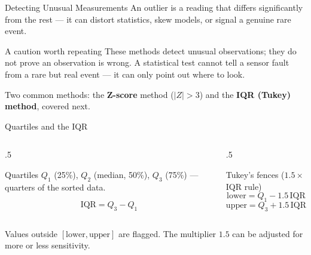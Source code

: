 \documentclass[9pt,aspectratio=169,xcolor=table]{beamer}
\begin{document}
\begin{frame}{Detecting Unusual Measurements}
    \leavevmode
    \small
    An outlier is a reading that differs significantly from the rest ---
    it can distort statistics, skew models, or signal a genuine rare
    event.

    \vspace{2mm}
    \begin{alertblock}{A caution worth repeating}
        These methods detect \alert{unusual} observations; they do not
        prove an observation is \alert{wrong}. A statistical test cannot
        tell a sensor fault from a rare but real event --- it can only
        point out where to look.
    \end{alertblock}

    \vspace{2mm}
    Two common methods: the \textbf{Z-score} method ($|Z| > 3$) and the
    \textbf{IQR (Tukey) method}, covered next.
\end{frame}

\begin{frame}{Quartiles and the IQR}
    \leavevmode
    \begin{columns}[t]
        \begin{column}{.5\textwidth}
            \begin{block}{Quartiles}
                \small $Q_1$ (25\%), $Q_2$ (median, 50\%), $Q_3$ (75\%)
                --- quarters of the sorted data.
            \end{block}
            \vspace{2mm}
            \[
            \text{IQR} = Q_3 - Q_1
            \]
        \end{column}
        \begin{column}{.5\textwidth}
            \begin{block}{Tukey's fences ($1.5\times$IQR rule)}
                \small
                \[
                \text{lower} = Q_1 - 1.5\,\text{IQR}
                \]
                \[
                \text{upper} = Q_3 + 1.5\,\text{IQR}
                \]
            \end{block}
        \end{column}
    \end{columns}

    \vspace{3mm}
    {\small Values outside $[\text{lower}, \text{upper}]$ are flagged.
    The multiplier $1.5$ can be adjusted for more or less sensitivity.}
\end{frame}
\end{document}
